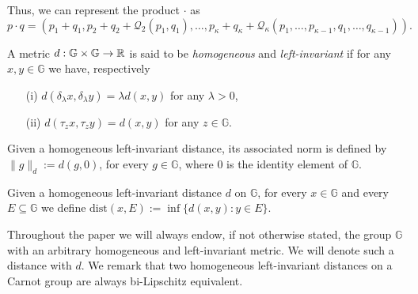 \documentclass[10pt, a4paper,
oneside, headinclude,footinclude]{scrartcl}
\begin{document}
Thus, we can represent the product $\cdot$ as
\begin{equation}\label{opgr}
p\cdot q= (p_1+q_1,p_2+q_2+\mathscr{Q}_2(p_1,q_1),\dots ,p_\kappa +q_\kappa+\mathscr{Q}_\kappa (p_1,\dots , p_{\kappa-1} ,q_1,\dots ,q_{\kappa-1})). 
\end{equation}
%



\begin{definizione}
A metric $d:\mathbb{G}\times \mathbb{G}\to \mathbb{R}$ is said to be {\em homogeneous} and {\em left-invariant} if for any $x,y\in \mathbb{G}$ we have, respectively
\begin{itemize}
    \item[(i)] $d(\delta_\lambda x,\delta_\lambda y)=\lambda d(x,y)$ for any $\lambda>0$,
    \item[(ii)] $d(\tau_z x,\tau_z y)=d(x,y)$ for any $z\in \mathbb{G}$.
\end{itemize}
Given a homogeneous left-invariant distance, its associated norm is defined by $\|g\|_{d}:=d(g,0)$, for every $g\in\mathbb G$, where $0$ is the identity element of $\mathbb G$.

Given a homogeneous left-invariant distance $d$ on $\mathbb G$, for every $x\in \mathbb G$ and every $E\subseteq \mathbb G$ we define $\mathrm{dist}(x,E):=\inf\{d(x,y):y\in E\}$.
\end{definizione}

Throughout the paper we will always endow, if not otherwise stated, the group $\mathbb{G}$ with an arbitrary homogeneous and left-invariant metric. We will denote such a distance with $d$. We remark that two homogeneous left-invariant distances on a Carnot group are always bi-Lipschitz equivalent.

\end{document}
